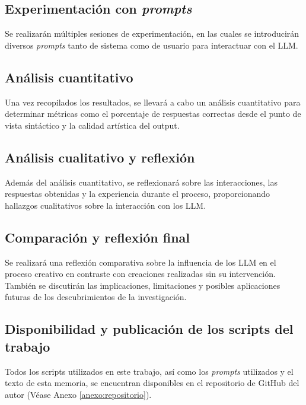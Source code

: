 
\subsection{Experimentación con \textit{prompts}}
Se realizarán múltiples sesiones de experimentación, en las cuales se introducirán diversos \textit{prompts} tanto de sistema como de usuario para interactuar con el LLM.

\subsection{Análisis cuantitativo}
Una vez recopilados los resultados, se llevará a cabo un análisis cuantitativo para determinar métricas como el porcentaje de respuestas correctas desde el punto de vista sintáctico y la calidad artística del output.

\subsection{Análisis cualitativo y reflexión}
Además del análisis cuantitativo, se reflexionará sobre las interacciones, las respuestas obtenidas y la experiencia durante el proceso, proporcionando hallazgos cualitativos sobre la interacción con los LLM.

\subsection{Comparación y reflexión final}
Se realizará una reflexión comparativa sobre la influencia de los LLM en el proceso creativo en contraste con creaciones realizadas sin su intervención. También se discutirán las implicaciones, limitaciones y posibles aplicaciones futuras de los descubrimientos de la investigación.

\subsection{Disponibilidad y publicación de los scripts del trabajo}
Todos los scripts utilizados en este trabajo, así como los \textit{prompts} utilizados y el texto de esta memoria, se encuentran disponibles en el repositorio de GitHub del autor (Véase Anexo \ref{anexo:repositorio}).